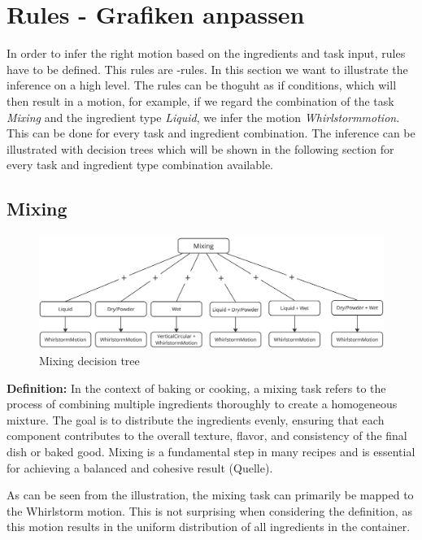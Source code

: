 \section{Rules - Grafiken anpassen}
In order to infer the right motion based on the ingredients and task input, rules have to be defined. This rules are -rules.
In this section we want to illustrate the inference on a high level.
The rules can be thoguht as if conditions, which will then result in a motion, 
for example, if we regard the combination of the task \textit{Mixing} and the ingredient type \textit{Liquid}, we infer the motion \textit{Whirlstormmotion}. 
This can be done for every task and ingredient combination. 
The inference can be illustrated with decision trees which will be shown in the following section for every task and ingredient type combination available. 

\subsection{Mixing}
\begin{figure}[H]
\includegraphics[scale=0.18]{Graphics/MixingDecisionTree.jpg}
\caption{Mixing decision tree}
\end{figure}
\textbf{Definition:} In the context of baking or cooking, a mixing task refers to the process of combining multiple ingredients thoroughly to create a homogeneous mixture. The goal is to distribute the ingredients evenly, ensuring that each component contributes to the overall texture, flavor, and consistency of the final dish or baked good. Mixing is a fundamental step in many recipes and is essential for achieving a balanced and cohesive result (Quelle).


As can be seen from the illustration, the mixing task can primarily be mapped to the Whirlstorm motion. This is not surprising when considering the definition, as this motion results in the uniform distribution of all ingredients in the container.

